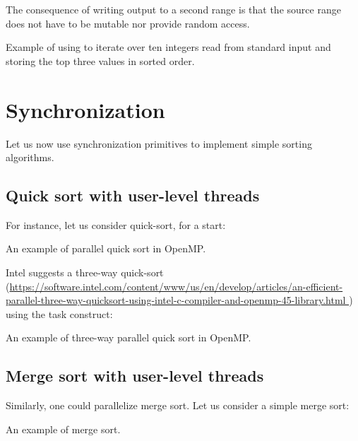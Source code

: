 The consequence of writing output to a second range is that the source range does not have to be mutable nor provide random access.

\begin{codebox}[]{\href{https://compiler-explorer.com/z/vjKc5nY31}{\ExternalLink}}
\footnotesize Example of using  to iterate over ten integers read from standard input and storing the top three values in sorted order.
\tcblower
{}
\end{codebox}

\section{Synchronization}

Let us now use synchronization primitives to implement simple sorting algorithms. 

\subsection{Quick sort with user-level threads}

For instance, let us consider quick-sort, for a start:

\begin{codebox}[breakable]{}
\footnotesize An example of parallel quick sort in OpenMP.
\tcblower
{}
\end{codebox}

Intel suggests a three-way quick-sort (\url{https://software.intel.com/content/www/us/en/develop/articles/an-efficient-parallel-three-way-quicksort-using-intel-c-compiler-and-openmp-45-library.html
}) using the task construct:

\begin{codebox}[breakable]{}
\footnotesize An example of three-way parallel quick sort in OpenMP.
\tcblower
{}
\end{codebox}

\subsection{Merge sort with user-level threads}

Similarly, one could parallelize merge sort. Let us consider a simple merge sort:

\begin{codebox}[breakable]{}
    \footnotesize An example of merge sort.
    \tcblower
    \end{codebox}

